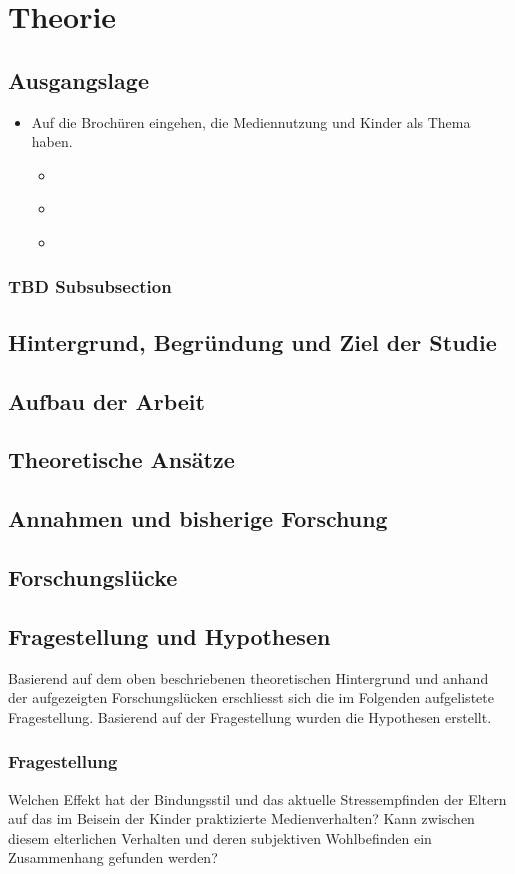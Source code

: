 \section{Theorie}
\subsection{Ausgangslage}
\begin{itemize}
    \item Auf die Brochüren eingehen, die Mediennutzung und Kinder als Thema haben.
    \begin{itemize}
        \item \cite{unknown2017}
        \item \cite{MariaLuisaNuesch2017}
        \item \cite{Elternbildung2017}
    \end{itemize}
\end{itemize}
\subsubsection{TBD Subsubsection}
\subsection{Hintergrund, Begründung und Ziel der Studie}
\subsection{Aufbau der Arbeit}
\subsection{Theoretische Ansätze}
\subsection{Annahmen und bisherige Forschung}
\subsection{Forschungslücke}
\subsection{Fragestellung und Hypothesen}
Basierend auf dem oben beschriebenen theoretischen Hintergrund und anhand der aufgezeigten Forschungslücken erschliesst sich die im Folgenden aufgelistete Fragestellung. Basierend auf der Fragestellung wurden die Hypothesen erstellt.
\subsubsection{Fragestellung} 
Welchen Effekt hat der Bindungsstil und das aktuelle Stressempfinden der Eltern auf das im Beisein der Kinder praktizierte Medienverhalten? Kann zwischen diesem elterlichen Verhalten und deren subjektiven Wohlbefinden ein Zusammenhang gefunden werden?
